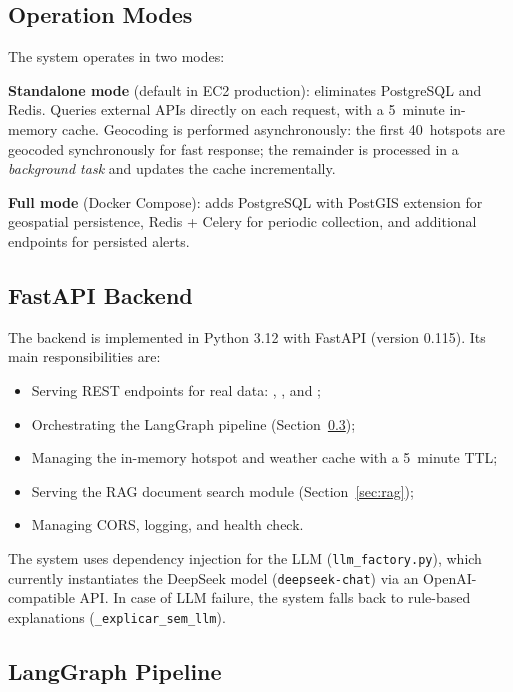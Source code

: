 \documentclass[preprint,12pt,times,numbers]{elsarticle}
\begin{document}
\subsection{Operation Modes}
\label{sec:modes}

The system operates in two modes:

\textbf{Standalone mode} (default in EC2 production): eliminates PostgreSQL and Redis. Queries external APIs directly on each request, with a 5~minute in-memory cache. Geocoding is performed asynchronously: the first 40~hotspots are geocoded synchronously for fast response; the remainder is processed in a \emph{background task} and updates the cache incrementally.

\textbf{Full mode} (Docker Compose): adds PostgreSQL with PostGIS extension for geospatial persistence, Redis + Celery for periodic collection, and additional endpoints for persisted alerts.

\subsection{FastAPI Backend}
\label{sec:backend}

The backend is implemented in Python 3.12 with FastAPI (version 0.115). Its main responsibilities are:

\begin{itemize}
    \item Serving REST endpoints for real data: , , and ;
    \item Orchestrating the LangGraph pipeline (Section~\ref{sec:langgraph});
    \item Managing the in-memory hotspot and weather cache with a 5~minute TTL;
    \item Serving the RAG document search module (Section~\ref{sec:rag});
    \item Managing CORS, logging, and health check.
\end{itemize}

The system uses dependency injection for the LLM (\texttt{llm\_factory.py}), which currently instantiates the DeepSeek model (\texttt{deepseek-chat}) via an OpenAI-compatible API. In case of LLM failure, the system falls back to rule-based explanations (\texttt{\_explicar\_sem\_llm}).

\subsection{LangGraph Pipeline}
\label{sec:langgraph}
\end{document}
